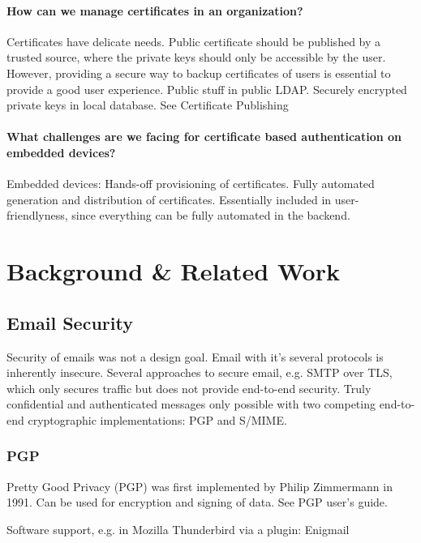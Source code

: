 \subsubsection*{How can we manage certificates in an organization?}
Certificates have delicate needs. Public certificate should be published by a trusted source, where the private keys
should only be accessible by the user. However, providing a secure way to backup certificates of users is essential to
provide a good user experience. Public stuff in public LDAP. Securely encrypted private keys in local database. See
Certificate Publishing

\subsubsection*{What challenges are we facing for certificate based authentication on embedded devices?}
Embedded devices: Hands-off provisioning of certificates. Fully automated generation and distribution of certificates.
Essentially included in user-friendlyness, since everything can be fully automated in the backend.


\chapter{Background \& Related Work}\label{ch:backgroundRelatedWork}
\section{Email Security}\label{sec:emailSecurity}

Security of emails was not a design goal.
Email with it's several protocols is inherently insecure.
Several approaches to secure email, e.g. SMTP over TLS, which only secures traffic but does not provide end-to-end
security.
Truly confidential and authenticated messages only possible with two competing end-to-end cryptographic implementations:
PGP and S/MIME.

\subsection{PGP}\label{subsec:pgp}

Pretty Good Privacy (PGP) was first implemented by Philip Zimmermann in 1991.
Can be used for encryption and signing of data.
See PGP user's guide.

Software support, e.g. in Mozilla Thunderbird via a plugin: Enigmail

